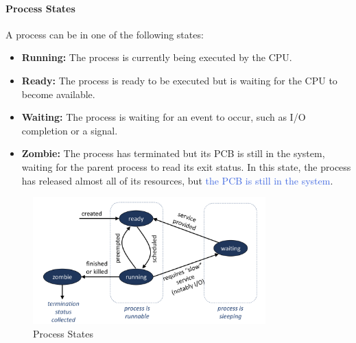 \documentclass[openany,12pt]{book}
\newcommand{\blue}[1]{\textcolor{RoyalBlue}{#1}}
\begin{document}
\paragraph{Process States}
A process can be in one of the following states:
\begin{itemize}
  \item \textbf{Running:} The process is currently being executed by the CPU.
  \item \textbf{Ready:} The process is ready to be executed but is waiting for the CPU to become available.
  \item \textbf{Waiting:} The process is waiting for an event to occur, such as I/O completion or a signal.
  \item \textbf{Zombie:} The process has terminated but its PCB is still in the system, waiting for the parent process to read its exit status. In this state, the process has released almost all of its resources, but \blue{the PCB is still in the system}.
\end{itemize}



\begin{figure}
  \centering
  \includegraphics[width=0.8\textwidth]{../Assets/process_states.png}
  \caption{Process States}
  \label{fig:process_states}
\end{figure}
\end{document}
